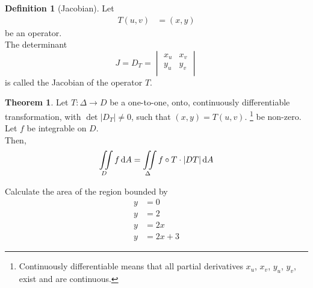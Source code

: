 \documentclass[fleqn, a4paper, 12pt, twoside]{article}
\theoremstyle{definition}
\newtheorem{definition}{Definition}
\theoremstyle{theorem}
\newtheorem{theorem}{Theorem}
\begin{document}
\begin{definition}[Jacobian]
	Let
	\begin{align*}
		T(u,v) & = (x,y)
	\end{align*}
	be an operator.\\
	The determinant
	\begin{equation*}
		J = D_T =
			\begin{vmatrix}
				x_u & x_v \\
				y_u & y_v \\
			\end{vmatrix}
	\end{equation*}
	is called the Jacobian of the operator $T$.
\end{definition}

\begin{theorem}
	Let $T : \Delta \to D$ be a one-to-one, onto, continuously differentiable transformation, with $\det|D_T| \neq 0$, such that $(x,y) = T(u,v)$.
	\footnote{Continuously differentiable means that all partial derivatives $x_u$, $x_v$, $y_u$, $y_v$, exist and are continuous.}
	be non-zero.
	Let $f$ be integrable on $D$.\\
	Then,
	\begin{equation*}
		\iint\limits_{D} f \dif A = \iint\limits_{\Delta} f \circ T \cdot |D T| \dif A
	\end{equation*}
\end{theorem}

\begin{question}
	Calculate the area of the region bounded by 
	\begin{align*}
		y & = 0   \\
		y & = 2   \\
		y & = 2 x \\
		y & = 2 x + 3
	\end{align*}
\end{question}
\end{document}
